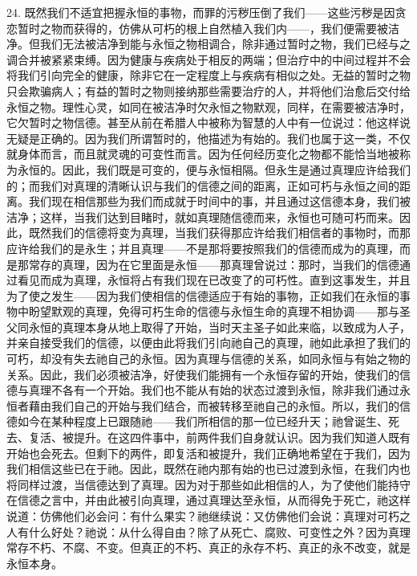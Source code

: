24. 既然我们不适宜把握永恒的事物，而罪的污秽压倒了我们——这些污秽是因贪恋暂时之物而获得的，仿佛从可朽的根上自然植入我们内——，我们便需要被洁净。但我们无法被洁净到能与永恒之物相调合，除非通过暂时之物，我们已经与之调合并被紧紧束缚。因为健康与疾病处于相反的两端；但治疗中的中间过程并不会将我们引向完全的健康，除非它在一定程度上与疾病有相似之处。无益的暂时之物只会欺骗病人；有益的暂时之物则接纳那些需要治疗的人，并将他们治愈后交付给永恒之物。理性心灵，如同在被洁净时欠永恒之物默观，同样，在需要被洁净时，它欠暂时之物信德。甚至从前在希腊人中被称为智慧的人中有一位说过：他这样说无疑是正确的。因为我们所谓暂时的，他描述为有始的。我们也属于这一类，不仅就身体而言，而且就灵魂的可变性而言。因为任何经历变化之物都不能恰当地被称为永恒的。因此，我们既是可变的，便与永恒相隔。但永生是通过真理应许给我们的；而我们对真理的清晰认识与我们的信德之间的距离，正如可朽与永恒之间的距离。我们现在相信那些为我们而成就于时间中的事，并且通过这信德本身，我们被洁净；这样，当我们达到目睹时，就如真理随信德而来，永恒也可随可朽而来。因此，既然我们的信德将变为真理，当我们获得那应许给我们相信者的事物时，而那应许给我们的是永生；并且真理——不是那将要按照我们的信德而成为的真理，而是那常存的真理，因为在它里面是永恒——那真理曾说过：那时，当我们的信德通过看见而成为真理，永恒将占有我们现在已改变了的可朽性。直到这事发生，并且为了使之发生——因为我们使相信的信德适应于有始的事物，正如我们在永恒的事物中盼望默观的真理，免得可朽生命的信德与永恒生命的真理不相协调——那与圣父同永恒的真理本身从地上取得了开始，当时天主圣子如此来临，以致成为人子，并亲自接受我们的信德，以便由此将我们引向祂自己的真理，祂如此承担了我们的可朽，却没有失去祂自己的永恒。因为真理与信德的关系，如同永恒与有始之物的关系。因此，我们必须被洁净，好使我们能拥有一个永恒存留的开始，使我们的信德与真理不各有一个开始。我们也不能从有始的状态过渡到永恒，除非我们通过永恒者藉由我们自己的开始与我们结合，而被转移至祂自己的永恒。所以，我们的信德如今在某种程度上已跟随祂——我们所相信的那一位已经升天；祂曾诞生、死去、复活、被提升。在这四件事中，前两件我们自身就认识。因为我们知道人既有开始也会死去。但剩下的两件，即复活和被提升，我们正确地希望在于我们，因为我们相信这些已在于祂。因此，既然在祂内那有始的也已过渡到永恒，在我们内也将同样过渡，当信德达到了真理。因为对于那些如此相信的人，为了使他们能持守在信德之言中，并由此被引向真理，通过真理达至永恒，从而得免于死亡，祂这样说道：仿佛他们必会问：有什么果实？祂继续说：又仿佛他们会说：真理对可朽之人有什么好处？祂说：从什么得自由？除了从死亡、腐败、可变性之外？因为真理常存不朽、不腐、不变。但真正的不朽、真正的永存不朽、真正的永不改变，就是永恒本身。\par

